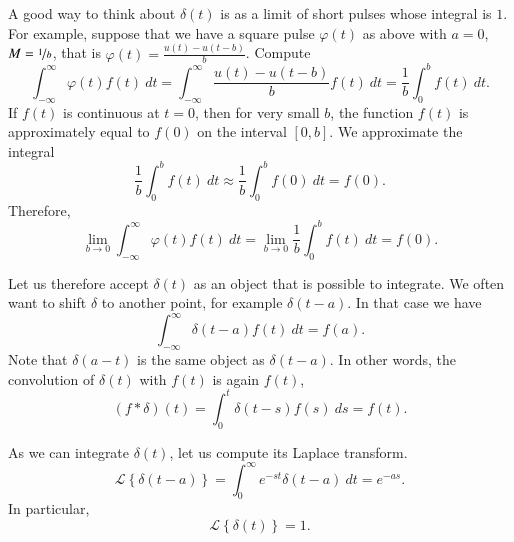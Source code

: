 \documentclass[12pt]{book}
\begin{document}
A good way to think about $\delta(t)$ is as a limit of short pulses
whose integral is $1$.  For example, suppose that
we have a square pulse $\varphi(t)$ as above with $a=0$,
$M=\nicefrac{1}{b}$, that is $\varphi(t) = \frac{u(t) - u(t-b)}{b}$.
Compute
\begin{equation*}
\int_{-\infty}^\infty \varphi(t) f(t) ~dt =
\int_{-\infty}^\infty \frac{u(t) - u(t-b)}{b} f(t) ~dt =
\frac{1}{b} \int_{0}^b f(t) ~dt .
\end{equation*}
If $f(t)$ is continuous at $t=0$, then
for very small $b$, the function $f(t)$ is approximately equal to $f(0)$ on
the interval $[0,b]$.  We approximate the integral
\begin{equation*}
\frac{1}{b} \int_{0}^b f(t) ~dt \approx
\frac{1}{b} \int_{0}^b f(0) ~dt = f(0) .
\end{equation*}
Therefore,
\begin{equation*}
\lim_{b\to 0}
\int_{-\infty}^\infty \varphi(t) f(t) ~dt =
\lim_{b\to 0}
\frac{1}{b} \int_{0}^b f(t) ~dt  = f(0) .
\end{equation*}

Let us therefore accept $\delta(t)$ as an object that is possible to
integrate.  We often want to shift $\delta$ to another point, for example
$\delta(t-a)$.  In that case we have
\begin{equation*}
\int_{-\infty}^\infty \delta(t-a) f(t) ~dt = f(a) .
\end{equation*}
Note that $\delta(a-t)$ is the same object as $\delta(t-a)$.
In other words, the convolution of $\delta(t)$ with $f(t)$ is again $f(t)$,
\begin{equation*}
(f * \delta) (t) = 
\int_{0}^t \delta(t-s) f(s) ~ds
= f(t) .
\end{equation*}

As we can integrate $\delta(t)$, let us compute its Laplace transform.
\begin{equation*}
\boxed{~~
{\mathcal{L}} \left\{ \delta(t-a) \right\}
=
\int_{0}^\infty e^{-st} \delta(t-a) ~dt = e^{-as} .
~~}
\end{equation*}
In particular,
\begin{equation*}
{\mathcal{L}} \left\{ \delta(t) \right\} = 1 .
\end{equation*}
\end{document}
